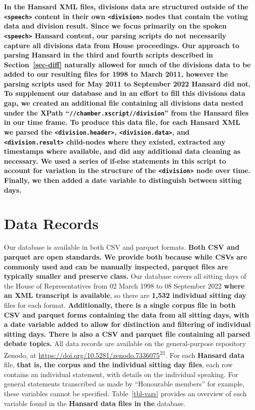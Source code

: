 \documentclass[
  letterpaper,
  DIV=11,
  numbers=noendperiod]{scrartcl}
\begin{document}
\textbf{In the Hansard XML files, divisions data are structured outside
of the \texttt{\textless{}speech\textgreater{}} content in their own
\texttt{\textless{}division\textgreater{}} nodes that contain the voting
data and division result. Since we focus primarily on the spoken
\texttt{\textless{}speech\textgreater{}} Hansard content, our parsing
scripts do not necessarily capture all divisions data from House
proceedings. Our approach to parsing Hansard in the third and fourth
scripts described in Section~\ref{sec-diff} naturally allowed for much
of the divisions data to be added to our resulting files for 1998 to
March 2011, however the parsing scripts used for May 2011 to September
2022 Hansard did not. To supplement our database and in an effort to
fill this divisions data gap, we created an additional file containing
all divisions data nested under the XPath
``\texttt{//chamber.xscript//division}'' from the Hansard files in our
time frame. To produce this data file, for each Hansard XML we parsed
the \texttt{\textless{}division.header\textgreater{}},
\texttt{\textless{}division.data\textgreater{}}, and
\texttt{\textless{}division.result\textgreater{}} child-nodes where they
existed, extracted any timestamps where available, and did any
additional data cleaning as necessary. We used a series of if-else
statements in this script to account for variation in the structure of
the \texttt{\textless{}division\textgreater{}} node over time. Finally,
we then added a date variable to distinguish between sitting days.}

\hypertarget{data-records}{%
\section{Data Records}\label{data-records}}

Our database is available in both CSV and parquet formats. \textbf{Both
CSV and parquet are open standards. We provide both because while CSVs
are commonly used and can be manually inspected, parquet files are
typically smaller and preserve class.} Our database covers all sitting
days of the House of Representatives from 02 March 1998 to 08 September
2022 \textbf{where an XML transcript is available}, so there are
\textbf{1,532 individual sitting day} files for each format.
\textbf{Additionally, there is a single corpus file in both CSV and
parquet forms containing the data from all sitting days, with a date
variable added to allow for distinction and filtering of individual
sitting days. There is also a CSV and parquet file containing all parsed
debate topics.} All data records are available on the general-purpose
repository Zenodo, at
\url{https://doi.org/10.5281/zenodo.7336075}\textsuperscript{21}. For
each \textbf{Hansard data} file, \textbf{that is, the corpus and the
individual sitting day files}, each row contains an individual
statement, with details on the individual speaking. For general
statements transcribed as made by ``Honourable members'' for example,
these variables cannot be specified. Table~\ref{tbl-vars} provides an
overview of each variable found in the \textbf{Hansard data files in
the} database.
\end{document}

